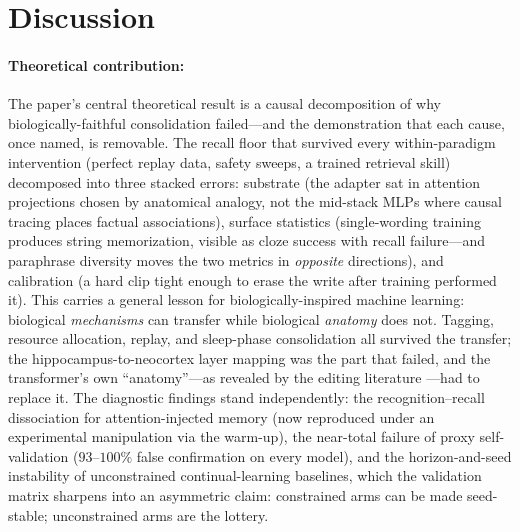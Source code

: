
\section{Discussion}
\label{sec:discussion}

\paragraph{Theoretical contribution:}
The paper's central theoretical result is a causal decomposition of why biologically-faithful consolidation failed---and the demonstration that each cause, once named, is removable. The recall floor that survived every within-paradigm intervention (perfect replay data, safety sweeps, a trained retrieval skill) decomposed into three stacked errors: substrate (the adapter sat in attention projections chosen by anatomical analogy, not the mid-stack MLPs where causal tracing places factual associations), surface statistics (single-wording training produces string memorization, visible as cloze success with recall failure---and paraphrase diversity moves the two metrics in \emph{opposite} directions), and calibration (a hard clip tight enough to erase the write after training performed it). This carries a general lesson for biologically-inspired machine learning: biological \emph{mechanisms} can transfer while biological \emph{anatomy} does not. Tagging, resource allocation, replay, and sleep-phase consolidation all survived the transfer; the hippocampus-to-neocortex layer mapping was the part that failed, and the transformer's own ``anatomy''---as revealed by the editing literature \citep{geva2021transformer,meng2022rome,meng2023memit}---had to replace it. The diagnostic findings stand independently: the recognition--recall dissociation for attention-injected memory (now reproduced under an experimental manipulation via the warm-up), the near-total failure of proxy self-validation ($93$--$100\%$ false confirmation on every model), and the horizon-and-seed instability of unconstrained continual-learning baselines, which the validation matrix sharpens into an asymmetric claim: constrained arms can be made seed-stable; unconstrained arms are the lottery.

